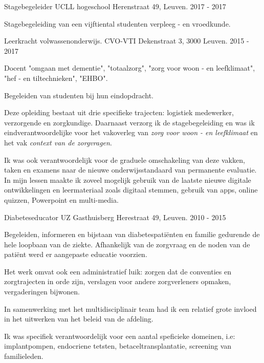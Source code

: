 \begin{cventries}

\cventry
{Stagebegeleider} %
{UCLL hogeschool} %
{Herenstraat 49, Leuven.} %
{2017 - 2017} %
{ %
	\begin{cvitems}
	\item Stagebegeleiding van een vijftiental studenten verpleeg - en vroedkunde.
	\end{cvitems}
}


\cventry
{Leerkracht volwassenonderwijs.} %
{CVO-VTI} %
{Dekenstraat 3, 3000 Leuven.} %
{2015 - 2017} %
{ %
	\begin{cvitems}
		\item Docent "omgaan met dementie", "totaalzorg", "zorg voor woon - en leefklimaat", "hef - en tiltechnieken", "EHBO".
		\item Begeleiden van studenten bij hun eindopdracht.
		\item Deze opleiding bestaat uit  drie specifieke trajecten: logistiek medewerker, verzorgende en zorgkundige. Daarnaast verzorg ik de stagebegeleiding en was ik eindverantwoordelijke voor het vakoverleg van \textit{zorg voor woon - en leefklimaat} en het vak \textit{context van de zorgvragen}. 
		\item Ik was ook verantwoordelijk voor de graduele omschakeling van deze vakken, taken en examens naar de nieuwe onderwijsstandaard van permanente evaluatie. 
		In mijn lessen maakte ik zoveel mogelijk gebruik van de laatste nieuwe digitale ontwikkelingen en leermateriaal zoals digitaal stemmen, gebruik van apps, online quizzen, Powerpoint en multi-media.
	\end{cvitems}
}


\cventry
{Diabeteseducator} %
{UZ Gasthuisberg} %
{Herestraat 49, Leuven.} %
{2010 - 2015} %
{ %
	\begin{cvitems}
		\item Begeleiden, informeren en bijstaan van diabetespatiënten en familie gedurende de hele loopbaan van de ziekte. Afhankelijk van de zorgvraag en de noden van de pati\"{e}nt werd er aangepaste educatie voorzien.
		\item Het werk omvat ook een administratief luik: zorgen dat de conventies en zorgtrajecten in orde zijn, verslagen voor andere zorgverleners opmaken, vergaderingen bijwonen. %
		\item In samenwerking met het multidisciplinair team had ik een relatief grote invloed in het uitwerken van het beleid van de afdeling.
		\item Ik was specifiek verantwoordelijk voor een aantal speficieke domeinen, i.e: implantpompen, endocriene tetsten, betaceltransplantatie, screening van familieleden.
	\end{cvitems}
}


\end{cventries}
